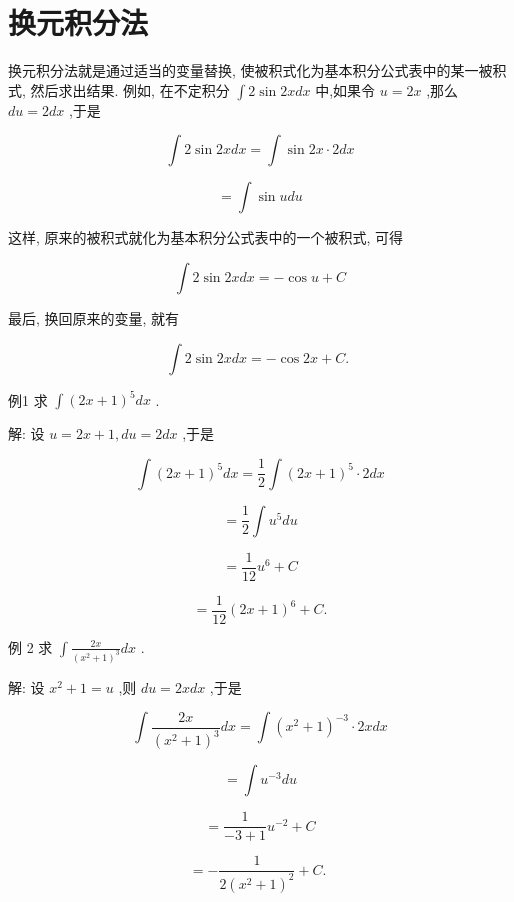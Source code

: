 \documentclass[lang=cn,newtx,10pt,scheme=chinese]{elegantbook}
\begin{document}
\section{换元积分法}

换元积分法就是通过适当的变量替换, 使被积式化为基本积分公式表中的某一被积式, 然后求出结果. 例如, 在不定积分 \(\int 2\sin {2xdx}\) 中,如果令 \(u = {2x}\) ,那么 \({du} = {2dx}\) ,于是

\[
\int 2\sin {2xdx} = \int \sin {2x} \cdot {2dx}
\]

\[
= \int \sin {udu}
\]

这样, 原来的被积式就化为基本积分公式表中的一个被积式, 可得

\[
\int 2\sin {2xdx} = - \cos u + C
\]

最后, 换回原来的变量, 就有

\[
\int 2\sin {2xdx} = - \cos {2x} + C\text{. }
\]

例1 求 \(\int {\left( 2x + 1\right) }^{5}{dx}\) .

解: 设 \(u = {2x} + 1,{du} = {2dx}\) ,于是

\[
\int {\left( 2x + 1\right) }^{5}{dx} = \frac{1}{2}\int {\left( 2x + 1\right) }^{5} \cdot {2dx}
\]

\[
= \frac{1}{2}\int {u}^{5}{du}
\]

\[
= \frac{1}{12}{u}^{6} + C
\]

\[
= \frac{1}{12}{\left( 2x + 1\right) }^{6} + C\text{.}
\]

例 2 求 \(\int \frac{2x}{{\left( {x}^{2} + 1\right) }^{3}}{dx}\) .

解: 设 \({x}^{2} + 1 = u\) ,则 \({du} = {2xdx}\) ,于是

\[
\int \frac{2x}{{\left( {x}^{2} + 1\right) }^{3}}{dx} = \int {\left( {x}^{2} + 1\right) }^{-3} \cdot {2xdx}
\]

\[
= \int {u}^{-3}{du}
\]

\[
= \frac{1}{-3 + 1}{u}^{-2} + C
\]

\[
= - \frac{1}{2{\left( {x}^{2} + 1\right) }^{2}} + C\text{. }
\]
\end{document}
